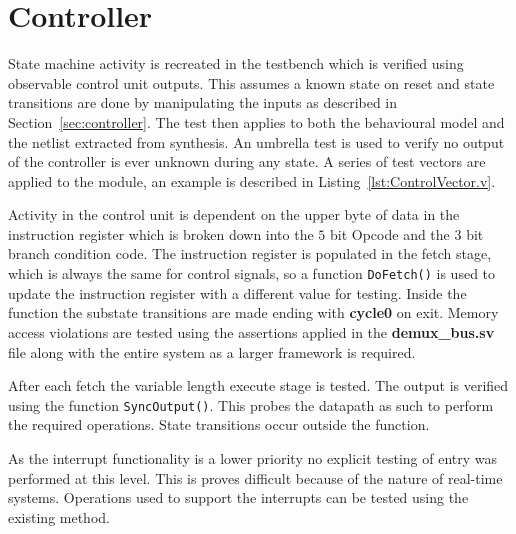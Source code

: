 
\section{Controller}

State machine activity is recreated in the testbench which is verified using observable control unit outputs.
This assumes a known state on reset and state transitions are done by manipulating the inputs as described in Section~\ref{sec:controller}.  
The test then applies to both the behavioural model and the netlist extracted from synthesis.
An umbrella test is used to verify no output of the controller is ever unknown during any state.
A series of test vectors are applied to the module, an example is described in Listing~\ref{lst:ControlVector.v}.




Activity in the control unit is dependent on the upper byte of data in the instruction register which is broken down into the $5$ bit Opcode and the $3$ bit branch condition code.  
The instruction register is populated in the fetch stage, which is always the same for control signals, so a function \texttt{DoFetch()} is used to update the instruction register with a different value for testing.
Inside the function the substate transitions are made ending with \textbf{cycle0} on exit.
Memory access violations are tested using the assertions applied in the \textbf{demux\_bus.sv} file along with the entire system as a larger framework is required.

After each fetch the variable length execute stage is tested.
The output is verified using the function \texttt{SyncOutput()}. 
This probes the datapath as such to perform the required operations.
State transitions occur outside the function.

As the interrupt functionality is a lower priority no explicit testing of entry was performed at this level.
This is proves difficult because of the nature of real-time systems.
Operations used to support the interrupts can be tested using the existing method. 
